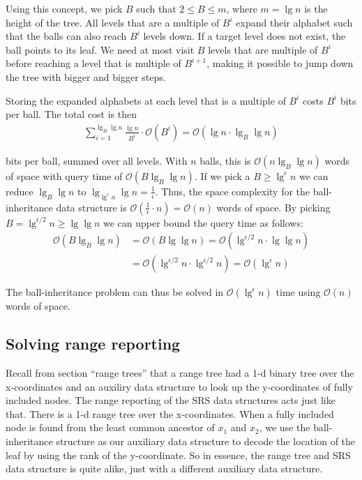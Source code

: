 Using this concept, we pick $B$ such that $2 \leq B \leq m$, where $m = \lg n$ is the height of the tree. All levels that are a multiple of $B^i$ expand their alphabet such that the balls can also reach $B^i$ levels down. If a target level does not exist, the ball points to its leaf. We need at most visit $B$ levels that are multiple of $B^i$ before reaching a level that is multiple of $B^{i+1}$, making it possible to jump down the tree with bigger and bigger steps.

Storing the expanded alphabets at each level that is a multiple of $B^i$ costs $B^i$ bits per ball. The total cost is then 
\begin{align*}
  \sum\limits_{i=1}^{\lg_B \lg n} \frac{\lg n}{B^i} \cdot \mathcal{O}(B^i) = \mathcal{O}(\lg n \cdot \lg_B \lg n)
\end{align*}


\noindent bits per ball, summed over all levels. With $n$ balls, this is $\mathcal{O}(n \lg_B \lg n)$ words of space with query time of $\mathcal{O}(B \lg_B \lg n)$. If we pick a $B \geq \lg^\epsilon n$  we can reduce $\lg_B \lg n$ to $\lg_{\lg^\epsilon n} \lg n = \frac{1}{\epsilon}$. Thus, the space complexity for the ball-inheritance data structure is $\mathcal{O}(\frac{1}{\epsilon} \cdot n) = \mathcal{O}(n)$ words of space. By picking $B = \lg^{\epsilon / 2} n \geq \lg \lg n$ we can upper bound the query time as follows:
\begin{align*}
  \mathcal{O}(B \lg_B \lg n) &= \mathcal{O}(B \lg \lg n) = \mathcal{O}(\lg^{\epsilon /2} n \cdot \lg \lg n)\\
  &= \mathcal{O}(\lg^{\epsilon / 2} n \cdot \lg^{\epsilon / 2} n) = \mathcal{O}(\lg^\epsilon n)
\end{align*}

\noindent The ball-inheritance problem can thus be solved in $\mathcal{O}(\lg^\epsilon n)$ time using $\mathcal{O}(n)$ words of space.

\subsection{Solving range reporting}

Recall from section ``range trees'' that a range tree had a 1-d binary tree over the x-coordinates and an auxiliry data structure to look up the y-coordinates of fully included nodes. The range reporting of the SRS data structures acts just like that. There is a 1-d range tree over the x-coordinates. When a fully included node is found from the least common ancestor of $x_1$ and $x_2$, we use the ball-inheritance structure as our auxiliary data structure to decode the location of the leaf by using the rank of the y-coordinate. So in essence, the range tree and SRS data structure is quite alike, just with a different auxiliary data structure. 


